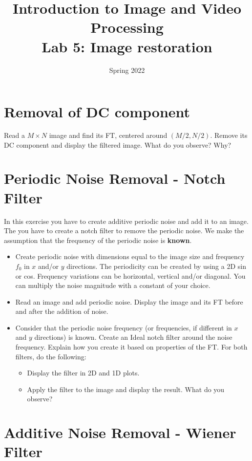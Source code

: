 \documentclass[a4paper]{article}
\title{Introduction to Image and Video Processing \\ Lab 5: Image restoration}
\date{Spring 2022}
\begin{document}
\maketitle


\section{Removal of DC component}

Read a $M \times N$ image and find its FT, centered around $(M/2,N/2)$. Remove its DC component and display the filtered image. What do you observe? Why?



\section{Periodic Noise Removal - Notch Filter}

In this exercise you have to create additive periodic noise and add it to an image. The you have to create a notch filter to remove the periodic noise. We make the assumption that the frequency of the periodic noise is \textbf{known}.
\begin{itemize}
\item Create periodic noise with dimensions equal to the image size and frequency $f_0$ in $x$ and/or $y$ directions. The periodicity can be created by using a 2D sin or cos. Frequency variations can be horizontal, vertical and/or diagonal. You can multiply the noise magnitude with a constant of your choice.
\item Read an image and add periodic noise. Display the image and its FT before and after the addition of noise.
\item Consider that the periodic noise frequency (or frequencies, if different in $x$ and $y$ directions) is known. Create an Ideal notch filter around the noise frequency. Explain how you create it based on properties of the FT. For both filters, do the following:
\begin{itemize}
\item Display the filter in 2D and 1D plots.
\item Apply the filter to the image and display the result. What do you observe?
\end{itemize}
\end{itemize}



\section{Additive Noise Removal - Wiener Filter}
\end{document}
